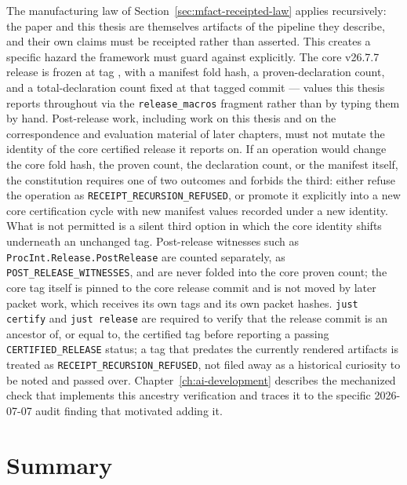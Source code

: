 The manufacturing law of Section~\ref{sec:mfact-receipted-law} applies
recursively: the paper and this thesis are themselves artifacts of the
pipeline they describe, and their own claims must be receipted rather
than asserted. This creates a specific hazard the framework must guard
against explicitly. The core v26.7.7 release is frozen at tag
\texttt{\ReleaseTag}, with a manifest fold hash, a proven-declaration
count, and a total-declaration count fixed at that tagged commit ---
values this thesis reports throughout via the \texttt{release\_macros}
fragment rather than by typing them by hand. Post-release work,
including work on this thesis and on the correspondence and evaluation
material of later chapters, must not mutate the identity of the core
certified release it reports on. If an operation would change the core
fold hash, the proven count, the declaration count, or the manifest
itself, the constitution requires one of two outcomes and forbids the
third: either refuse the operation as
\texttt{RECEIPT\_RECURSION\_REFUSED}, or promote it explicitly into a
new core certification cycle with new manifest values recorded under a
new identity. What is not permitted is a silent third option in which
the core identity shifts underneath an unchanged tag. Post-release
witnesses such as \texttt{ProcInt.Release.PostRelease} are counted
separately, as \texttt{POST\_RELEASE\_WITNESSES}, and are never folded
into the core proven count; the core tag itself is pinned to the core
release commit and is not moved by later packet work, which receives its
own tags and its own packet hashes. \texttt{just certify} and
\texttt{just release} are required to verify that the release commit is
an ancestor of, or equal to, the certified tag before reporting a
passing \texttt{CERTIFIED\_RELEASE} status; a tag that predates the
currently rendered artifacts is treated as
\texttt{RECEIPT\_RECURSION\_REFUSED}, not filed away as a historical
curiosity to be noted and passed over. Chapter~\ref{ch:ai-development}
describes the mechanized check that implements this ancestry
verification and traces it to the specific 2026-07-07 audit finding that
motivated adding it.

\section{Summary}

